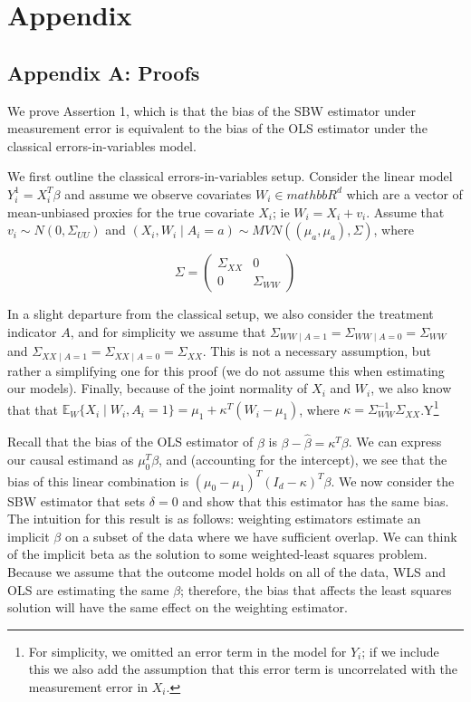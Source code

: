 \documentclass[12pt]{article}
\begin{document}
\cleardoublepage
 

\cleardoublepage

\section{Appendix}

\subsection{Appendix A: Proofs}

We prove Assertion 1, which is that the bias of the SBW estimator under measurement error is equivalent to the bias of the OLS estimator under the classical errors-in-variables model. 

We first outline the classical errors-in-variables setup. Consider the linear model $Y_i^1 = X_i^T\beta$ and assume we observe covariates $W_i \in mathbb{R}^d$ which are a vector of mean-unbiased proxies for the true covariate $X_i$; ie $W_i = X_i + v_i$. Assume that $v_i \sim N(0, \Sigma_{UU})$ and $(X_i, W_i \mid A_i = a) \sim MVN((\mu_{a}, \mu_{a}), \Sigma)$, where 

$$
\Sigma = \begin{pmatrix} 
\Sigma_{XX} & 0 \\ 
0 & \Sigma_{WW} 
\end{pmatrix}
$$ 

In a slight departure from the classical setup, we also consider the treatment indicator $A$, and for simplicity we assume that $\Sigma_{WW \mid A = 1} = \Sigma_{WW \mid A = 0} = \Sigma_{WW}$ and $\Sigma_{XX \mid A = 1} = \Sigma_{XX \mid A = 0} = \Sigma_{XX}$. This is not a necessary assumption, but rather a simplifying one for this proof (we do not assume this when estimating our models). Finally, because of the joint normality of $X_i$ and $W_i$, we also know that that $\mathbb{E}_W\{X_i \mid W_i, A_i = 1\} = \mu_1 + \kappa^T(W_i - \mu_1)$, where $\kappa = \Sigma_{WW}^{-1}\Sigma_{XX}$.Y\footnote{For simplicity, we omitted an error term in the model for $Y_i$; if we include this we also add the assumption that this error term is uncorrelated with the measurement error in $X_i$.} 

Recall that the bias of the OLS estimator of $\beta$ is $\beta - \hat{\beta} = \kappa^T\beta$. We can express our causal estimand as $\mu_0^T\beta$, and (accounting for the intercept), we see that the bias of this linear combination is $(\mu_0 - \mu_1)^T(I_d - \kappa)^T\beta$. We now consider the SBW estimator that sets $\delta = 0$ and show that this estimator has the same bias. The intuition for this result is as follows: weighting estimators estimate an implicit $\beta$ on a subset of the data where we have sufficient overlap. We can think of the implicit beta as the solution to some weighted-least squares problem. Because we assume that the outcome model holds on all of the data, WLS and OLS are estimating the same $\beta$; therefore, the bias that affects the least squares solution will have the same effect on the weighting estimator.  
\end{document}

